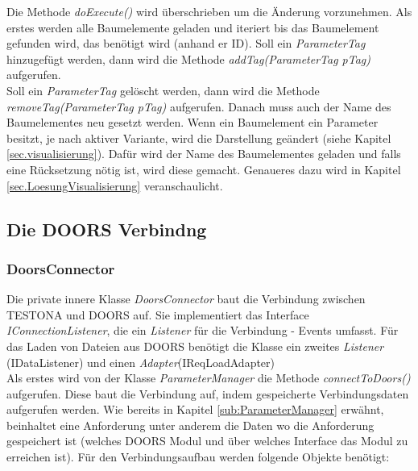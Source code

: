 Die Methode \textit{doExecute()} wird überschrieben um die Änderung vorzunehmen. Als erstes werden alle Baumelemente geladen und iteriert bis das Baumelement gefunden wird, das benötigt wird (anhand er ID). Soll ein \textit{ParameterTag} hinzugefügt werden, dann wird die Methode \textit{addTag(ParameterTag pTag)} aufgerufen.\\


Soll ein \textit{ParameterTag} gelöscht werden, dann wird die Methode \textit{removeTag(ParameterTag pTag)} aufgerufen. Danach muss auch der Name des Baumelementes neu gesetzt werden. Wenn ein Baumelement ein Parameter besitzt, je nach aktiver Variante, wird die Darstellung geändert (siehe Kapitel \ref{sec.visualisierung}). Dafür wird der Name des Baumelementes geladen und falls eine Rücksetzung nötig ist, wird diese gemacht. Genaueres dazu wird in Kapitel \ref{sec.LoesungVisualisierung} veranschaulicht.\\

\subsection{Die DOORS Verbindng}\label{sub.DoorsConn}
\subsubsection{DoorsConnector}


Die private innere Klasse \textit{DoorsConnector} baut die Verbindung zwischen TESTONA und DOORS auf. Sie implementiert das Interface \textit{IConnectionListener}, die ein \textit{Listener} für die Verbindung - Events umfasst. Für das Laden von Dateien aus DOORS benötigt die Klasse ein zweites \textit{Listener} (IDataListener) und einen \textit{Adapter}(IReqLoadAdapter) \\

Als erstes wird von der Klasse \textit{ParameterManager} die Methode \textit{connectToDoors()} aufgerufen. Diese baut die Verbindung auf, indem gespeicherte Verbindungsdaten aufgerufen werden. Wie bereits in Kapitel \ref{sub:ParameterManager} erwähnt, beinhaltet eine Anforderung unter anderem die Daten wo die Anforderung gespeichert ist (welches DOORS Modul und über welches Interface das Modul zu erreichen ist). Für den Verbindungsaufbau werden folgende Objekte benötigt:

